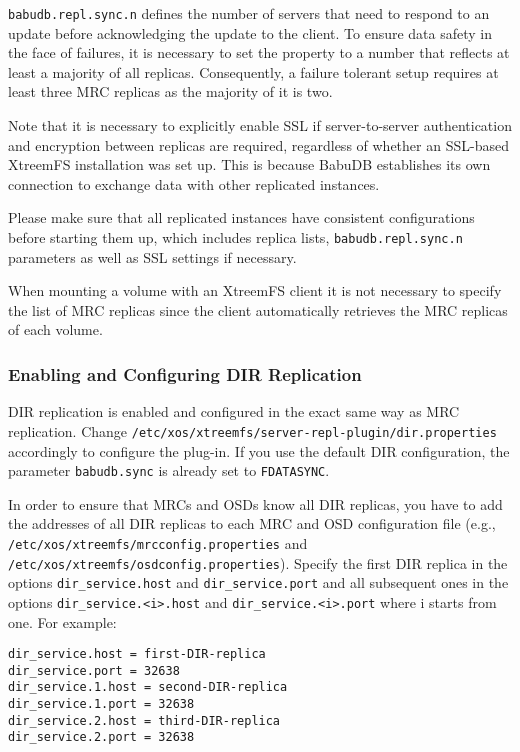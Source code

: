 \documentclass[a4paper,10pt]{book}
\begin{document}
\texttt{babudb.repl.sync.n} defines the number of servers that need to respond to an update before acknowledging the update to the client. To ensure data safety in the face of failures, it is necessary to set the property to a number that reflects at least a majority of all replicas. Consequently, a failure tolerant setup requires at least three MRC replicas as the majority of it is two.

Note that it is necessary to explicitly enable SSL if server-to-server authentication and encryption between replicas are required, regardless of whether an SSL-based XtreemFS installation was set up. This is because BabuDB establishes its own connection to exchange data with other replicated instances.

Please make sure that all replicated instances have consistent configurations before starting them up, which includes replica lists, \texttt{babudb.repl.sync.n} parameters as well as SSL settings if necessary.

When mounting a volume with an XtreemFS client it is not necessary to specify the list of MRC replicas since the client automatically retrieves the MRC replicas of each volume.

\subsubsection{Enabling and Configuring DIR Replication}
DIR replication is enabled and configured in the exact same way as MRC replication. Change \texttt{/etc/xos/xtreemfs/server-repl-plugin/dir.properties} accordingly to configure the plug-in. If you use the default DIR configuration, the parameter \texttt{babudb.sync} is already set to \texttt{FDATASYNC}.

In order to ensure that MRCs and OSDs know all DIR replicas, you have to add the addresses of all DIR replicas to each MRC and OSD configuration file (e.g.,  \texttt{/etc/xos/xtreemfs/mrcconfig.properties} and \texttt{/etc/xos/xtreemfs/osdconfig.properties}). Specify the first DIR replica in the options \texttt{dir\_service.host} and \texttt{dir\_service.port} and all subsequent ones in the options \texttt{dir\_service.<i>.host} and \texttt{dir\_service.<i>.port} where i starts from one. For example:

\begin{verbatim}
dir_service.host = first-DIR-replica
dir_service.port = 32638
dir_service.1.host = second-DIR-replica
dir_service.1.port = 32638
dir_service.2.host = third-DIR-replica
dir_service.2.port = 32638
\end{verbatim}
\end{document}
